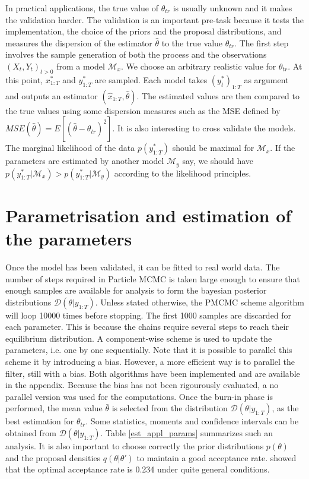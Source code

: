 \documentclass[11pt,a4,twosided,singlespacing,titlepagenumber=on]{scrreprt}
\numberwithin{equation}{chapter} %
\theoremstyle{remark}
\begin{document}
In practical applications, the true value of $\theta_{tr}$ is usually unknown and it makes the validation harder. The validation is an important pre-task because it tests the implementation, the choice of the priors and the proposal distributions, and measures the dispersion of the estimator $\hat{\theta}$ to the true value $\theta_{tr}$. The first step involves the sample generation of both the process and the observations $(X_t, Y_t)_{t > 0}$ from a model $\mathcal{M}_x$. We choose an arbitrary realistic value for $\theta_{tr}$. At this point, $x^*_{1:T}$ and $y^*_{1:T}$ are sampled. Each model takes $(y_t^*)_{1:T}$ as argument and outputs an estimator $(\hat{x}_{1:T}, \hat{\theta})$. The estimated values are then compared to the true values using some dispersion measures such as the MSE defined by $MSE(\hat{\theta}) = E[ ( \hat{\theta} - \theta_{tr} )^2 ]$. It is also interesting to cross validate the models. The marginal likelihood of the data $p(y^*_{1:T})$ should be maximal for $\mathcal{M}_x$. If the parameters are estimated by another model $\mathcal{M}_y$ say, we should have $p(y^*_{1:T} | \mathcal{M}_x) > p(y^*_{1:T} | \mathcal{M}_y)$ according to the likelihood principles.

\section{Parametrisation and estimation of the parameters}

Once the model has been validated, it can be fitted to real world data. The number of steps required in Particle MCMC is taken large enough to ensure that enough samples are available for analysis to form the bayesian posterior distributions $\mathcal{D}(\theta|y_{1:T})$. Unless stated otherwise, the PMCMC scheme algorithm will loop 10000 times before stopping. The first 1000 samples are discarded for each parameter. This is because the chains require several steps to reach their equilibrium distribution. A component-wise scheme is used to update the parameters, i.e. one by one sequentially. Note that it is possible to parallel this scheme it by introducing a bias. However, a more efficient way is to parallel the filter, still with a bias. Both algorithms have been implemented and are available in the appendix. Because the bias has not been rigourously evaluated, a no parallel version was used for the computations. Once the burn-in phase is performed, the mean value $\bar{\theta}$ is selected from the distribution $\mathcal{D}(\theta|y_{1:T})$, as the best estimation for $\theta_{tr}$. Some statistics, moments and confidence intervals can be obtained from $\mathcal{D}(\theta|y_{1:T})$. Table \ref{est_appl_params} summarizes such an analysis. It is also important to choose correctly the prior distributions $p(\theta)$ and the proposal densities $q(\theta|\theta')$ to maintain a good acceptance rate. \cite{roberts1997} showed that the optimal acceptance rate is 0.234 under quite general conditions.
\end{document}
